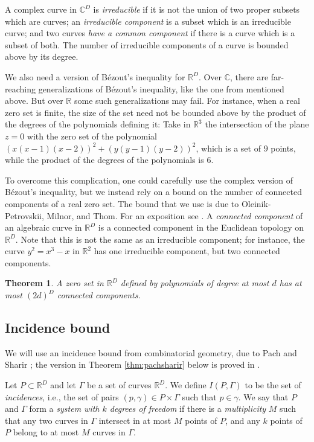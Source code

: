 \documentclass[12pt]{article}
\newtheorem{theorem}{Theorem}[section]
\newcommand{\RR}{\mathbb R}
\newcommand{\CC}{\mathbb C}
\begin{document}
A complex curve in $\CC^D$ is {\it irreducible} if it is not the union of two proper subsets which are curves; an {\it irreducible component} is a subset which is an irreducible curve; and two curves {\it have a common component} if there is a curve which is a subset of both.
The number of irreducible components of a curve is bounded above by its degree.

We also need a version of B\'ezout's inequality for $\RR^D$.
Over $\CC$, there are far-reaching generalizations of B\'ezout's inequality, like the one from \cite{heintz:definability} mentioned above.
But over $\RR$ some such generalizations may fail.
For instance, when a real zero set is finite, the size of the set need not be bounded above by the product of the degrees of the polynomials defining it: Take in $\RR^3$ the intersection of the plane $z=0$ with the zero set of the polynomial
$(x(x-1)(x-2))^2 + (y (y-1)(y-2))^2$,
which is a set of $9$ points, while the product of the degrees of the polynomials is $6$.

To overcome this complication, one could carefully use the complex version of B\'ezout's inequality, but we instead rely on a bound on the number of connected components of a real zero set.
The bound that we use is due to Oleinik-Petrovskii, Milnor, and Thom. 
For an exposition see \cite[Chapter 7]{basu:real}.
A {\it connected component} of an algebraic curve in $\RR^D$
is a connected component in the Euclidean topology on $\RR^D$.
Note that this is not the same as an irreducible component;
for instance, the curve $y^2 = x^3 -x$ in $\RR^2$ has one irreducible component,
but two connected components.

\begin{theorem}\label{thm:milnorthom}
 A zero set in $\RR^D$ defined by polynomials of degree at most $d$ has at most $(2d)^D$ connected components.
\end{theorem}

 
\subsection{Incidence bound}\label{subsec:incidences}
We will use an incidence bound from combinatorial geometry,
due to Pach and Sharir \cite{pach:repeated, pach:incidences};
the version in Theorem \ref{thm:pachsharir} below is proved in \cite{kaplan:simple}.

Let $P\subset\RR^D$ and let $\Gamma$ be a set of curves $\RR^D$.
We define $I(P,\Gamma)$ to be the set of {\it incidences},
i.e., the set of pairs $(p, \gamma)\in P\times \Gamma$ such that $p\in \gamma$.
We say that $P$ and $\Gamma$ form a {\em system with $k$ degrees of freedom}
if there is a {\em multiplicity} $M$ such that any two curves in $\Gamma$ intersect in at most $M$ points of $P$,
and any $k$ points of $P$ belong to at most $M$ curves in $\Gamma$.
\end{document}
